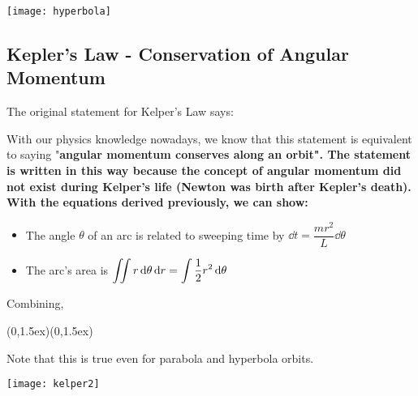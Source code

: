 \documentclass[class=article, crop=false, 12pt]{standalone}
\begin{document}
\begin{center}
    \begin{minipage}{0.8\linewidth}
        \centering
        \texttt{[image: hyperbola]}
    \end{minipage}
\end{center}





\subsection{Kepler's  Law - Conservation of Angular Momentum}

The original statement for Kelper's  Law says:


With our physics knowledge nowadays, 
we know that this statement is equivalent to saying "\bf{angular momentum conserves along an orbit}".
The statement is written in this way because the concept of angular momentum did not exist during Kelper's life 
(Newton was birth after Kepler's death).\\

With the equations derived previously, we can show:

\begin{itemize}
    \item The angle $\theta$ of an arc is related to sweeping time by $\dd{t} = \dfrac{mr^2}{L}\dd{\theta}$
    \item The arc's area is $\displaystyle \iint r\dd{\theta}\dd{r} = \int \frac{1}{2} r^2 \dd{\theta}$
\end{itemize}

Combining,

{(0,1.5ex)}{(0,1.5ex)}

Note that this is true even for parabola and hyperbola orbits.

\begin{center}
    \begin{minipage}{0.7\linewidth}
        \centering
        \texttt{[image: kelper2]}
    \end{minipage}
\end{center}
\end{document}
